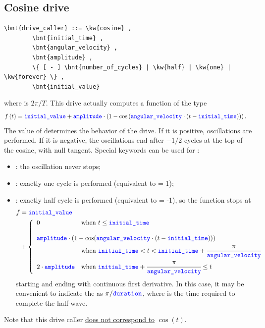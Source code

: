 \subsection{Cosine drive}
\begin{Verbatim}[commandchars=\\\{\}]
    \bnt{drive_caller} ::= \kw{cosine} ,
        \bnt{initial_time} ,
        \bnt{angular_velocity} ,
        \bnt{amplitude} ,
        \{ [ - ] \bnt{number_of_cycles} | \kw{half} | \kw{one} | \kw{forever} \} , 
        \bnt{initial_value}
\end{Verbatim}
where  is $2\pi/T$.
This drive actually computes a function of the type
\begin{align}
	f\left( t \right) &= \textcolor{blue}{\texttt{initial\_value}} + \textcolor{blue}{\texttt{amplitude}} \cdot \left( 
		1 - \mathrm{cos}\left( 
			\textcolor{blue}{\texttt{angular\_velocity}} \cdot \left( 
				t - \textcolor{blue}{\texttt{initial\_time}}
			 \right)
		 \right)
	 \right) .
\end{align}
The value of  determines the behavior of the
drive. 
If it is positive,  oscillations are performed.
If it is negative, the oscillations end after
$-1/2$ cycles at the top of the cosine, with null
tangent.   
Special keywords can be used for :
\begin{itemize}
	\item {}: the oscillation never stops;
	\item {}: exactly one cycle is performed (equivalent to  = 1);
	\item {}: exactly half cycle is performed (equivalent to  = -1),
	so the function stops at
	\begin{align}
		f &= \nt{initial\_value} \nonumber \\
		& \mbox{} + \lcubr{\matr{ll}{
			0 & \text{when } t \le \nt{initial\_time}
			\\ \\
			\multicolumn{2}{l}{\nt{amplitude} \cdot ( 1 - \cos( \nt{angular\_velocity} \cdot (t - \nt{initial\_time})))}
			\\
				& \text{when } \nt{initial\_time} < t < \nt{initial\_time} + \cfrac{\pi}{\nt{angular\_velocity}}
			\\
			2 \cdot \nt{amplitude} & \text{when } \nt{initial\_time} + \cfrac{\pi}{\nt{angular\_velocity}} \le t
		}}
	\end{align}
	starting and ending with continuous first derivative.
	In this case, it may be convenient to indicate the 
	as $\pi/\textcolor{blue}{\texttt{duration}}$, where  is the time
	required to complete the half-wave.
\end{itemize}
Note that this drive caller \underline{does not correspond to} $\cos(t)$. 

